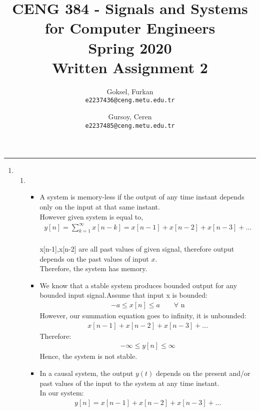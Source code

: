 \documentclass[10pt,a4paper, margin=1in]{article}
\author{
  Goksel, Furkan\\
  \texttt{e2237436@ceng.metu.edu.tr}
  \and
  Gursoy, Ceren\\
  \texttt{e2237485@ceng.metu.edu.tr}
}
\title{CENG 384 - Signals and Systems for Computer Engineers \\
Spring 2020 \\
Written Assignment 2}
\begin{document}
\maketitle



\noindent\rule{19cm}{1.2pt}

\begin{enumerate}

\item %
    \begin{enumerate}
    \item %
    \begin{itemize}
        \item A system is memory-less if the output of any time instant depends only on the input at that same instant.\\
    However given system is equal to, 
    \begin{gather*}
        y[n] = \sum_{k=1}^\infty x[n-k] = x[n-1]+x[n-2]+x[n-3]+...
    \end{gather*} \\
    x[n-1],x[n-2] are all past values of given signal, therefore output depends on the past values of input $x$.\\
    Therefore, the system has memory. \\
    \item We know that a stable system produces bounded output for any bounded input signal.Assume that input x is bounded: 
     \begin{gather*}
         -a \le x[n] \le a  \text{$\qquad \forall$ n} 
     \end{gather*} 
     However, our summation equation goes to infinity, it is unbounded: 
         \begin{gather*}
         x[n-1]+x[n-2]+x[n-3]+... 
        \end{gather*}
    Therefore:
    \begin{gather*}
        -\infty \le y[n] \le \infty
    \end{gather*}
    Hence, the system is not stable. \\
    \item In a causal system, the output $y(t)$ depends on the present and/or past values of the input to the system at any time instant.\\
    In our system:
        \begin{gather*}
         y[n]=x[n-1]+x[n-2]+x[n-3]+... 
        \end{gather*}

\end{itemize}
\end{enumerate}
\end{enumerate}
\end{document}
